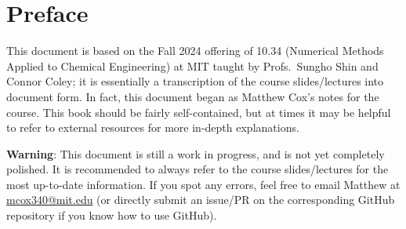 \chapter*{Preface}
This document is based on the Fall 2024 offering of 10.34 (Numerical Methods Applied to Chemical Engineering) at MIT taught by Profs.\ Sungho Shin and Connor Coley; it is essentially a transcription of the course slides/lectures into document form. In fact, this document began as Matthew Cox's notes for the course. This book should be fairly self-contained, but at times it may be helpful to refer to external resources for more in-depth explanations.

\begin{warningBox}
    \textbf{Warning}: This document is still a work in progress, and is not yet completely polished. It is recommended to always refer to the course slides/lectures for the most up-to-date information. If you spot any errors, feel free to email Matthew at \href{mailto:mcox340@mit.edu}{mcox340@mit.edu} (or directly submit an issue/PR on the corresponding GitHub repository if you know how to use GitHub).
\end{warningBox}



